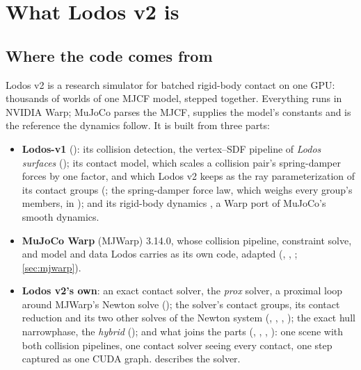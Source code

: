 \setcounter{tocdepth}{2}
\tableofcontents

\section{What Lodos v2 is}\label{sec:what}

\subsection{Where the code comes from}\label{sec:fused}

Lodos v2 is a research simulator for batched rigid-body contact on one GPU: thousands of worlds of one MJCF model, stepped together. Everything runs in NVIDIA Warp; MuJoCo parses the MJCF, supplies the model's constants and is the reference the dynamics follow. It is built from three parts:

\begin{itemize}
\item \textbf{Lodos-v1} (): its collision detection, the vertex--SDF pipeline of \emph{Lodos surfaces} (); its contact model, which scales a collision pair's spring-damper forces by one factor, and which Lodos v2 keeps as the ray parameterization of its contact groups (; the spring-damper force law, which weighs every group's members, in ); and its rigid-body dynamics , a Warp port of MuJoCo's smooth dynamics.
\item \textbf{MuJoCo Warp} (MJWarp) 3.14.0, whose collision pipeline, constraint solve, and model and data Lodos carries as its own code, adapted (, , ; \cref{sec:mjwarp}).
\item \textbf{Lodos v2's own}: an exact contact solver, the \emph{prox} solver, a proximal loop around MJWarp's Newton solve (); the solver's contact groups, its contact reduction and its two other solves of the Newton system (, , , ); the exact hull narrowphase, the \emph{hybrid} (); and what joins the parts (, , , ): one scene with both collision pipelines, one contact solver seeing every contact, one step captured as one CUDA graph.  describes the solver.
\end{itemize}

